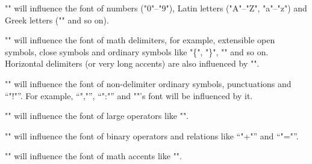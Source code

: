 "\mathalphafontname" will influence the font of numbers ("0"--"9"), Latin 
letters ("A"--"Z", "a"--"z") and Greek letters ("\alpha" and so on). 

"\mathdelimiterfontname" will influence the font of math delimiters, 
for example, extensible open symbols, close symbols and ordinary symbols 
like "\{", "\}", "\vert" and so on. 
Horizontal delimiters (or very long accents) are also influenced by 
"\mathdelimiterfontname".

"\mathordfontname" will influence the font of non-delimiter ordinary 
symbols, punctuations and ``"!"''. For example, ``","'', ``":"'' and 
"\colon"'s font will be influenced by it.

"\mathopfontname" will influence the font of large operators like "\sum".

"\mathbinfontname" will influence the font of binary operators and relations 
like ``"+"'' and ``"="''.

"\mathaccentfontname" will influence the font of math accents like "\dot".



\closeout\tocout
\bye